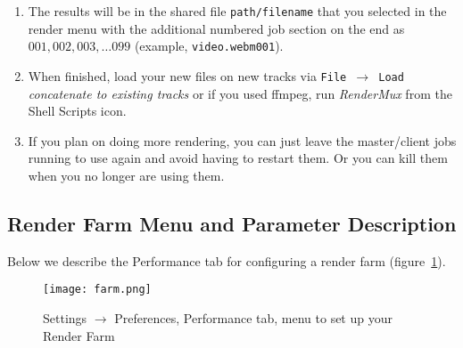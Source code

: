 \begin{enumerate}
{    $\rightarrow$ Render} or \texttt{File $\rightarrow$ Batch Render}
  and check OK.
\item The results will be in the shared file \texttt{path/filename}
  that you selected in the render menu with the additional numbered
  job section on the end as $001, 002, 003, \dots 099$ (example,
  \texttt{video.webm001}).
\item When finished, load your new files on new tracks via
  \texttt{File $\rightarrow$ Load} \textit{concatenate to existing
    tracks} or if you used ffmpeg, run \textit{RenderMux} from the Shell
  Scripts icon.
\item If you plan on doing more rendering, you can just leave the
  master/client jobs running to use again and avoid having to restart
  them.  Or you can kill them when you no longer are using them.
\end{enumerate}

\subsection{Render Farm Menu and Parameter Description}%
\label{sub:render_farm_parameter_description}

Below we describe the Performance tab for configuring a render farm
(figure~\ref{fig:farm}).

\begin{figure}[htpb] \centering
  \texttt{[image: farm.png]}
  \caption{Settings $\rightarrow$ Preferences, Performance tab, menu
    to set up your Render Farm}
  \label{fig:farm}
\end{figure}

